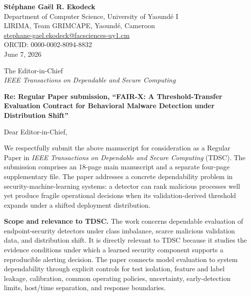 \documentclass[11pt]{article}
\begin{document}
\begin{flushright}
\textbf{St\'{e}phane Ga\"{e}l R. Ekodeck}\\
Department of Computer Science, University of Yaound\'{e} I\\
LIRIMA, Team GRIMCAPE, Yaound\'{e}, Cameroon\\
\href{mailto:stephane-gael.ekodeck@facsciences-uy1.cm}
{stephane-gael.ekodeck@facsciences-uy1.cm}\\
ORCID: 0000-0002-8094-8832\\
June 7, 2026
\end{flushright}

\vspace{2pt}

The Editor-in-Chief\\
\textit{IEEE Transactions on Dependable and Secure Computing}

\textbf{Re: Regular Paper submission, ``FAIR-X: A Threshold-Transfer
Evaluation Contract for Behavioral Malware Detection under Distribution
Shift''}

Dear Editor-in-Chief,

We respectfully submit the above manuscript for consideration as a Regular
Paper in \textit{IEEE Transactions on Dependable and Secure Computing}
(TDSC). The submission comprises an 18-page main manuscript and a separate
four-page supplementary file. The paper addresses a concrete dependability
problem in
security-machine-learning systems: a detector can rank malicious processes
well yet produce fragile operational decisions when its validation-derived
threshold expands under a shifted deployment distribution.

\textbf{Scope and relevance to TDSC.}
The work concerns dependable evaluation of endpoint-security detectors under
class imbalance, scarce malicious validation data, and distribution shift.
It is directly relevant to TDSC because it studies the evidence conditions
under which a learned security component supports a reproducible alerting decision. The paper
connects model evaluation to system dependability through explicit controls
for test isolation, feature and label leakage, calibration, common operating
policies, uncertainty, early-detection limits, host/time separation, and
response boundaries.
\end{document}
